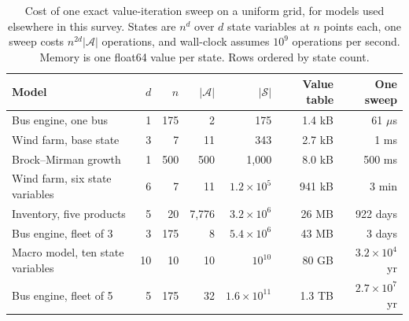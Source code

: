 \begin{table}[htbp]
\centering
\caption{Cost of one exact value-iteration sweep on a uniform grid, for models used elsewhere in this survey. States are $n^d$ over $d$ state variables at $n$ points each, one sweep costs $n^{2d}|\mathcal{A}|$ operations, and wall-clock assumes $10^{9}$ operations per second. Memory is one float64 value per state. Rows ordered by state count.}
\label{tab:curse_grid_dp}
\begin{tabular}{lrrrrrr}
\toprule
Model & $d$ & $n$ & $|\mathcal{A}|$ & $|\mathcal{S}|$ & Value table & One sweep \\
\midrule
Bus engine, one bus \citep{Rust1987} & 1 & 175 & 2 & 175 & 1.4 kB & 61 $\mu$s \\
Wind farm, base state & 3 & 7 & 11 & 343 & 2.7 kB & 1 ms \\
Brock--Mirman growth & 1 & 500 & 500 & 1,000 & 8.0 kB & 500 ms \\
Wind farm, six state variables & 6 & 7 & 11 & $1.2 \times 10^{5}$ & 941 kB & 3 min \\
Inventory, five products & 5 & 20 & 7,776 & $3.2 \times 10^{6}$ & 26 MB & 922 days \\
Bus engine, fleet of 3 & 3 & 175 & 8 & $5.4 \times 10^{6}$ & 43 MB & 3 days \\
Macro model, ten state variables & 10 & 10 & 10 & $10^{10}$ & 80 GB & $3.2 \times 10^{4}$ yr \\
Bus engine, fleet of 5 & 5 & 175 & 32 & $1.6 \times 10^{11}$ & 1.3 TB & $2.7 \times 10^{7}$ yr \\
\bottomrule
\end{tabular}
\end{table}
